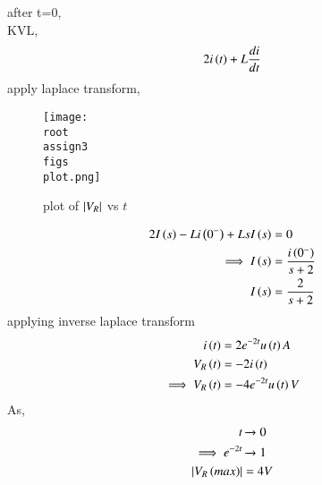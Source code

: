 \documentclass[journal,12pt,twocolumn]{IEEEtran}
\theoremstyle{remark}
\begin{document}
after t=0,\\
KVL, \begin{align}
2i\left(t\right)+L\frac{di}{dt}
\end{align}
apply laplace transform,
\begin{figure}[!ht]
     \centering
     \texttt{[image: \\root\\assign3\\figs\\plot.png]}
     \caption{ plot of $\left\vert V_{R}\right\vert$ vs  $t$}
 \end{figure}
 \begin{align}
2I\left(s\right)-Li\left({0^{-}}\right)+LsI\left(s\right)&=0\\
\implies I\left(s\right)&=\frac{i\left({0^{-}}\right)}{s+2}\\
I\left(s\right)&=\frac{2}{s+2}
 \end{align}
 applying inverse laplace transform
 \begin{align}
  i\left(t\right)&=2e^{-2t} u\left(t\right)A\\
  V_R\left(t\right)&=-2i\left(t\right)\\
  \implies V_R\left(t\right)&=-4 e^{-2t} u\left(t\right)V
 \end{align}  
  As,
 \begin{align}
    t & \xrightarrow{} 0\\
     \implies e^{-2t}&\xrightarrow{} 1\\
     \left\vert V_R\left(max\right)\right\vert&=4V
 \end{align}
\end{document}
